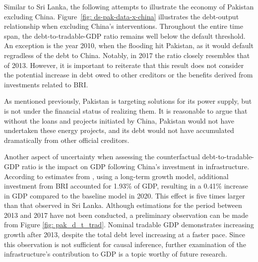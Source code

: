 Similar to Sri Lanka, the following attempts to illustrate the economy of Pakistan excluding China. Figure~\ref{fig: ds-pak-data-x-china} illustrates the debt-output relationship when excluding China's interventions. Throughout the entire time span, the debt-to-tradable-GDP ratio remains well below the default threshold. An exception is the year 2010, when the flooding hit Pakistan, as it would default regradless of the debt to China. Notably, in 2017 the ratio closely resembles that of 2013. However, it is important to reiterate that this result does not consider the potential increase in debt owed to other creditors or the benefits derived from investments related to BRI.

As mentioned previously, Pakistan is targeting solutions for its power supply, but is not under the financial status of realizing them. It is reasonable to argue that without the loans and projects initiated by China, Pakistan would not have undertaken these energy projects, and its debt would not have accumulated dramatically from other official creditors.

Another aspect of uncertainty when assessing the counterfactual debt-to-tradable-GDP ratio is the impact on GDP following China's investment in infrastructure. According to estimates from \citet*{Bandiera-Vasileios-BRI-debt}, using a long-term growth model, additional investment from BRI accounted for 1.93\% of GDP, resulting in a 0.41\% increase in GDP compared to the baseline model in 2020. This effect is five times larger than that observed in Sri Lanka. Although estimations for the period between 2013 and 2017 have not been conducted, a preliminary observation can be made from Figure \ref{fig: pak_d_t_trad}. Nominal tradable GDP demonstrates increasing growth after 2013, despite the total debt level increasing at a faster pace. Since this observation is not sufficient for causal inference, further examination of the infrastructure's contribution to GDP is a topic worthy of future research.
